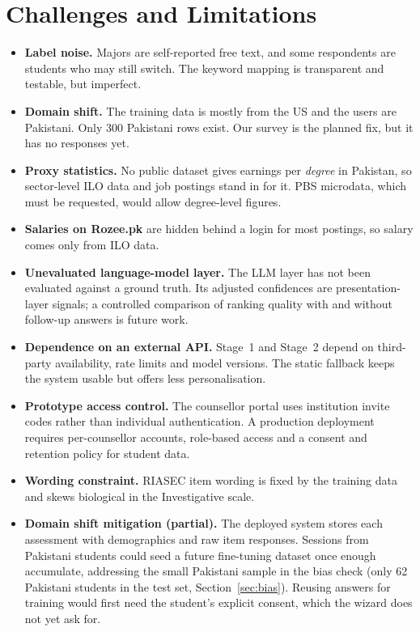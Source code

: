 \documentclass[11pt,a4paper]{article}
\begin{document}


\section{Challenges and Limitations}\label{sec:limitations}
\begin{itemize}
\item \textbf{Label noise.} Majors are self-reported free text, and some respondents are students
      who may still switch. The keyword mapping is transparent and testable, but imperfect.
\item \textbf{Domain shift.} The training data is mostly from the US and the users are Pakistani.
      Only 300 Pakistani rows exist. Our survey is the planned fix, but it has no responses yet.
\item \textbf{Proxy statistics.} No public dataset gives earnings per \emph{degree} in Pakistan,
      so sector-level ILO data and job postings stand in for it. PBS microdata, which must be
      requested, would allow degree-level figures.
\item \textbf{Salaries on Rozee.pk} are hidden behind a login for most postings, so salary comes
      only from ILO data.
\item \textbf{Unevaluated language-model layer.} The LLM layer has not been
      evaluated against a ground truth. Its adjusted confidences are
      presentation-layer signals; a controlled comparison of ranking
      quality with and without follow-up answers is future work.
\item \textbf{Dependence on an external API.} Stage~1 and Stage~2 depend on
      third-party availability, rate limits and model versions. The static
      fallback keeps the system usable but offers less personalisation.
\item \textbf{Prototype access control.} The counsellor portal uses
      institution invite codes rather than individual authentication.
      A production deployment requires per-counsellor accounts, role-based
      access and a consent and retention policy for student data.
\item \textbf{Wording constraint.} RIASEC item wording is fixed by the
      training data and skews biological in the Investigative scale.
\item \textbf{Domain shift mitigation (partial).} The deployed system stores each assessment
      with demographics and raw item responses. Sessions from Pakistani students could seed a
      future fine-tuning dataset once enough accumulate, addressing the small Pakistani sample
      in the bias check (only 62 Pakistani students in the test set, Section~\ref{sec:bias}).
      Reusing answers for training would first need the student's explicit consent, which the
      wizard does not yet ask for.
\end{itemize}
\end{document}
